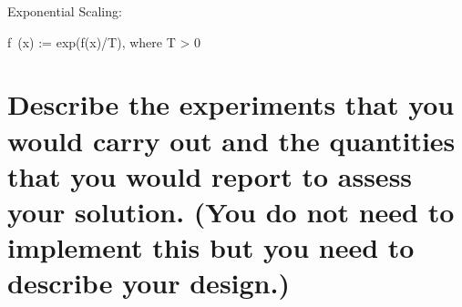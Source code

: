 Exponential Scaling:

 f~(x) := exp(f(x)/T),	where T > 0

\section{Describe the experiments that you would carry out and the quantities that you would report to assess your solution. (You do not need to implement this but you need to describe your design.)}





